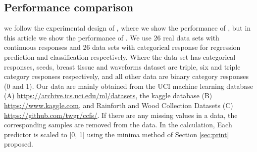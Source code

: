 \documentclass[nojss]{jss}
\numberwithin{equation}{section}
\begin{document}
\subsection{Performance comparison}
we follow the experimental design of \cite{zhan2022consistency}, where we show the performance of  , but in this article we show the performance of . We use 26 real data sets with continuous responses  and 26 data sets with categorical response for regression prediction and classification respectively. Where the data set has categorical responses, seeds, breast tissue and waveforms dataset are triple, six and triple category responses respectively, and all other data are binary category responses (0 and 1). Our data are mainly obtained from the UCI machine learning database (A) \url{https://archive.ics.uci.edu/ml/datasets}, the kaggle database (B) \url{https://www.kaggle.com}, and Rainforth and Wood \cite{rainforth2015canonical} Collection Datasets (C) \url{https://github.com/twgr/ccfs/}.
If there are any missing values in a data, the corresponding samples are removed from the data. In the calculation, Each predictor is scaled to [0, 1] using the minima method of Section \ref{sec:print} proposed.

\end{document}
